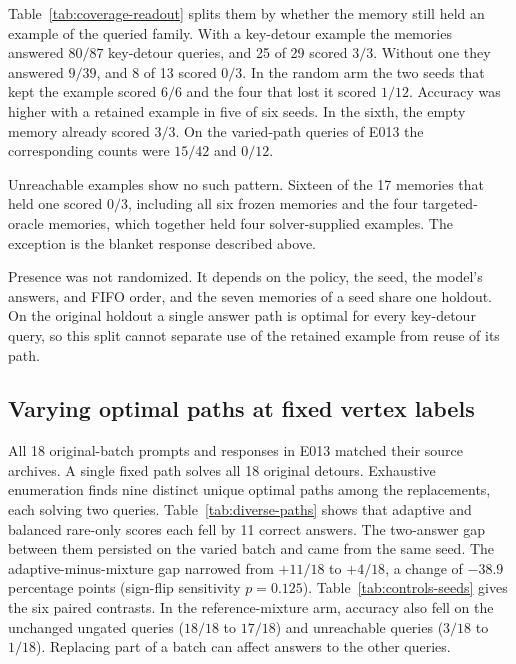 \documentclass[11pt]{article}
\begin{document}
Table~\ref{tab:coverage-readout} splits them by whether the memory
still held an example of the queried family. With a key-detour example
the memories answered $80/87$ key-detour queries, and 25 of 29 scored
$3/3$. Without one they answered $9/39$, and 8 of 13 scored $0/3$. In
the random arm the two seeds that kept the example scored $6/6$ and
the four that lost it scored $1/12$. Accuracy was higher with a
retained example in five of six seeds. In the sixth, the empty memory
already scored $3/3$. On the varied-path queries of E013 the
corresponding counts were $15/42$ and $0/12$.

Unreachable examples show no such pattern. Sixteen of the 17 memories
that held one scored $0/3$, including all six frozen memories and the
four targeted-oracle memories, which together held four
solver-supplied examples. The exception is the blanket response described above.

Presence was not randomized. It depends on the policy, the seed, the
model's answers, and FIFO order, and the seven memories of a seed share
one holdout. On the original holdout a single answer path is optimal
for every key-detour query, so this split cannot separate use of the
retained example from reuse of its path.



\subsection{Varying optimal paths at fixed vertex labels}

All 18 original-batch prompts and responses in E013 matched their
source archives. A single fixed path solves all 18 original detours.
Exhaustive enumeration finds nine distinct unique optimal paths among
the replacements, each solving two queries. Table~\ref{tab:diverse-paths}
shows that adaptive and balanced rare-only scores each fell by 11
correct answers. The two-answer gap between them persisted on the
varied batch and came from the same seed. The adaptive-minus-mixture
gap narrowed from $+11/18$ to $+4/18$, a change of $-38.9$ percentage
points (sign-flip sensitivity $p=0.125$).
Table~\ref{tab:controls-seeds} gives the six paired contrasts.
In the reference-mixture arm, accuracy also fell on the unchanged
ungated queries ($18/18$ to $17/18$) and unreachable queries ($3/18$
to $1/18$). Replacing part of a batch can affect answers to the
other queries.


\end{document}

